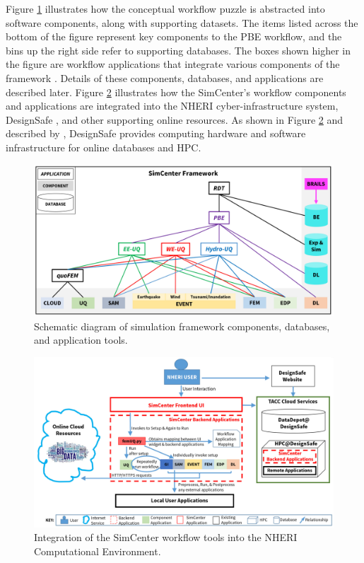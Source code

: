 Figure \ref{fig:intro_SimCenter_tools} illustrates how the conceptual workflow puzzle is abstracted into software components, along with supporting datasets.  The items listed across the bottom of the figure represent key components to the PBE workflow, and the bins up the right side refer to supporting databases.  The boxes shown higher in the figure are workflow applications that integrate various components of the framework \citep{mckenna2020simcenter}.  Details of these components, databases, and applications are described later.  Figure \ref{fig:intro_SimCenter_integration} illustrates how the SimCenter’s workflow components and applications are integrated into the NHERI cyber-infrastructure system, DesignSafe \citep{rathje2017designsafe}, and other supporting online resources.  As shown in Figure \ref{fig:intro_SimCenter_integration} and described by \citet{rathje2017designsafe}, DesignSafe provides computing hardware and software infrastructure for online databases and HPC.

\begin{figure}[htb]
    \centering
    \includegraphics[width=1.0\textwidth, angle = 0]{Figures/SimCenter_tools.pdf}
    \caption{Schematic diagram of simulation framework components, databases, and application tools.}
    \label{fig:intro_SimCenter_tools}
\end{figure}

\begin{figure}[htb]
    \centering
    \includegraphics[width=1.0\textwidth, angle = 0]{Figures/SimCenter_integration.pdf}
    \caption{Integration of the SimCenter workflow tools into the NHERI Computational Environment.}
    \label{fig:intro_SimCenter_integration}
\end{figure}

